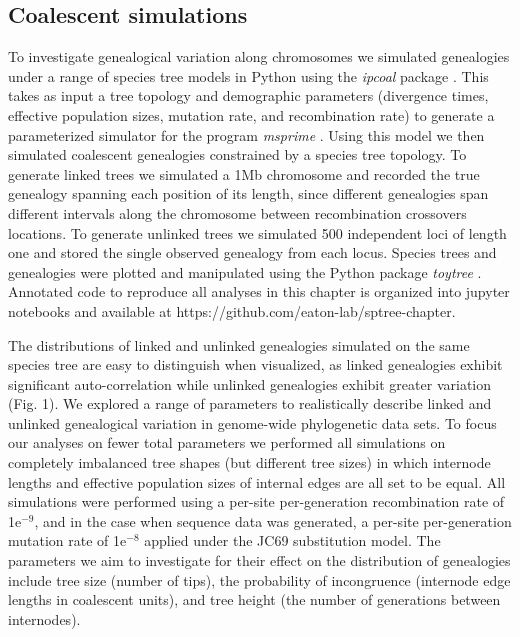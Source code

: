 \documentclass[11pt]{article}
\begin{document}


\subsection{Coalescent simulations}
To investigate genealogical variation along chromosomes we simulated genealogies under a range of species tree models in Python using the \emph{ipcoal} package \citep{mckenzie_ipcoal_2020}. This takes as input a tree topology and demographic parameters (divergence times, effective population sizes, mutation rate, and recombination rate) to generate a parameterized simulator for the program \emph{msprime} \citep{kelleher_efficient_2016}. Using this model we then simulated coalescent genealogies constrained by a species tree topology. To generate linked trees we simulated a 1Mb chromosome and recorded the true genealogy spanning each position of its length, since different genealogies span different intervals along the chromosome between recombination crossovers locations. To generate unlinked trees we simulated 500 independent loci of length one and stored the single observed genealogy from each locus. Species trees and genealogies were plotted and manipulated using the Python package \emph{toytree} \citep{eaton_toytree_2020}. Annotated code to reproduce all analyses in this chapter is organized into jupyter notebooks and available at https://github.com/eaton-lab/sptree-chapter.

The distributions of linked and unlinked genealogies simulated on the same species tree are easy to distinguish when visualized, as linked genealogies exhibit significant auto-correlation  while unlinked genealogies exhibit greater variation (Fig. 1). We explored a range of parameters to realistically describe linked and unlinked genealogical variation in genome-wide phylogenetic data sets. To focus our analyses on fewer total parameters we performed all simulations on completely imbalanced tree shapes (but different tree sizes) in which internode lengths and effective population sizes of internal edges are all set to be equal. All simulations were performed using a per-site per-generation recombination rate of 1e$^{-9}$, and in the case when sequence data was generated, a per-site per-generation mutation rate of 1e$^{-8}$ applied under the JC69 substitution model. The parameters we aim to investigate for their effect on the distribution of genealogies include tree size (number of tips), the probability of incongruence (internode edge lengths in coalescent units), and tree height (the number of generations between internodes). 
\end{document}
